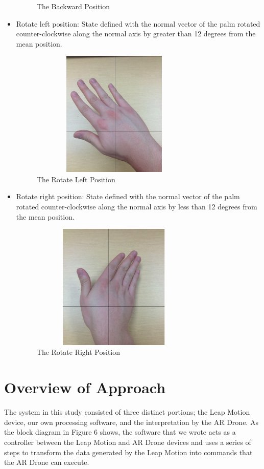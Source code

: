 \documentclass[letterpaper,english, 12pt]{article}
\begin{document}
\begin{itemize}
\begin{figure}[t]
			\caption{The Backward Position}
		\end{figure}
		\item Rotate left position: State defined with the normal vector of the palm rotated counter-clockwise along the normal axis by greater than 12 degrees from the mean position. 
		\begin{figure}[t]
			\centering
			\includegraphics[height=6cm, width=80mm]{pics/rotateLeft.jpg} 
			\caption{The Rotate Left Position}
		\end{figure}
		\item Rotate right position: State defined with the normal vector of the palm rotated counter-clockwise along the normal axis by less than 12 degrees from the mean position. 
		\begin{figure}[t]
			\centering
			\includegraphics[height=6cm, width=80mm]{pics/rotateRight.jpg} 
			\caption{The Rotate Right Position}
		\end{figure}
	
\end{itemize}

\section*{Overview of Approach}

The system in this study consisted of three distinct portions; the Leap Motion device, our own processing software, and the interpretation by the AR Drone. As the block diagram in Figure 6 shows, the software that we wrote acts as a controller between the Leap Motion and AR Drone devices and uses a series of steps to transform the data generated by the Leap Motion into commands that the AR Drone can execute.
\end{document}
